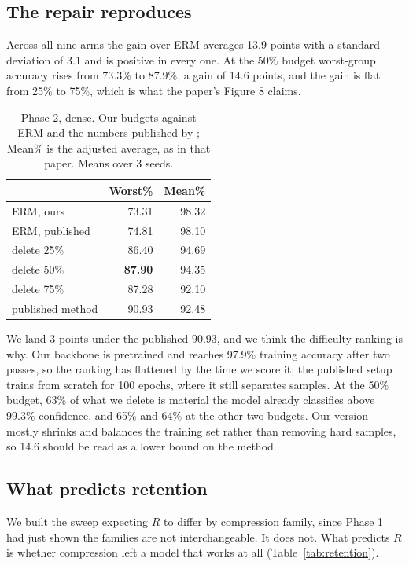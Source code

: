 \documentclass[11pt]{article}
\begin{document}
\subsection{The repair reproduces}

Across all nine arms the gain over ERM averages 13.9 points with a standard
deviation of 3.1 and is positive in every one. At the 50\% budget worst-group
accuracy rises from 73.3\% to 87.9\%, a gain of 14.6 points, and the gain is
flat from 25\% to 75\%, which is what the paper's Figure 8 claims.

\begin{table}[t]
\centering
\small
\caption{Phase 2, dense. Our budgets against ERM and the numbers published
by \citet{mulchandani2025severing}; Mean\% is the adjusted average, as in
that paper. Means over 3 seeds.}
\label{tab:phase2}
\begin{tabular}{@{}lrr@{}}
\toprule
 & Worst\% & Mean\% \\
\midrule
ERM, ours                  & 73.31 & 98.32 \\
ERM, published             & 74.81 & 98.10 \\
\midrule
delete 25\%                & 86.40 & 94.69 \\
delete 50\%                & \textbf{87.90} & 94.35 \\
delete 75\%                & 87.28 & 92.10 \\
published method           & 90.93 & 92.48 \\
\bottomrule
\end{tabular}
\end{table}

We land 3 points under the published 90.93, and we think the difficulty
ranking is why. Our backbone is pretrained and reaches 97.9\% training accuracy
after two passes, so the ranking has flattened by the time we score it; the
published setup trains from scratch for 100 epochs, where it still separates
samples. At the 50\% budget, 63\% of what we delete is material the model
already classifies above 99.3\% confidence, and 65\% and 64\% at the other two
budgets. Our version mostly shrinks and balances the training set rather than
removing hard samples, so 14.6 should be read as a lower bound on the method.

\subsection{What predicts retention}

We built the sweep expecting $R$ to differ by compression family, since Phase
1 had just shown the families are not interchangeable. It does not. What
predicts $R$ is whether compression left a model that works at all
(Table~\ref{tab:retention}).
\end{document}

